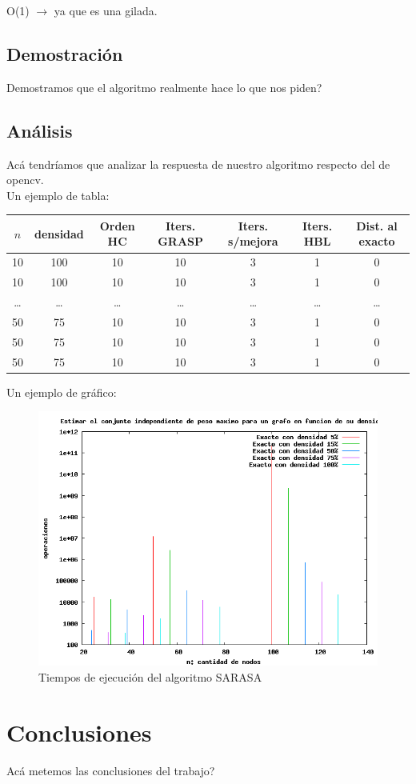 \documentclass[11pt]{article}
\begin{document}
\textbf{} O(1) $\rightarrow$ ya que es una gilada.\\

\subsection{Demostración}
Demostramos que el algoritmo realmente hace lo que nos piden?





\subsection{Análisis}
Acá tendríamos que analizar la respuesta de nuestro algoritmo respecto del de opencv.\\

Un ejemplo de tabla:
\begin{center}
\begin{tabular}{|c c | c c c c | c |}
\hline
$n$ 	& densidad &	Orden HC & Iters. GRASP & Iters. s/mejora & Iters. HBL &
Dist. al exacto\\
\hline
10 & 100 & 10 & 10 & 3 & 1 & 0\\
10 & 100 & 10 & 10 & 3 & 1 & 0\\
\ldots& \ldots & \ldots & \ldots & \ldots & \ldots & \ldots\\
50 & 75 & 10 & 10 & 3 & 1 & 0\\
50 & 75 & 10 & 10 & 3 & 1 & 0\\
50 & 75 & 10 & 10 & 3 & 1 & 0\\
\hline
\end{tabular}
\end{center}

Un ejemplo de gráfico:\\
\begin{center}
\begin{figure}[H]
	\includegraphics[scale=.7,natwidth=640pt,
	natheight=480pt]{img/tiempos.png} \caption{Tiempos de ejecución del algoritmo SARASA}
	\label{fig:mwispGraspSinMejoraOps}
\end{figure}
\end{center}
\newpage

\section{Conclusiones}
Acá metemos las conclusiones del trabajo?
\label{'lastPage'}
\end{document}
